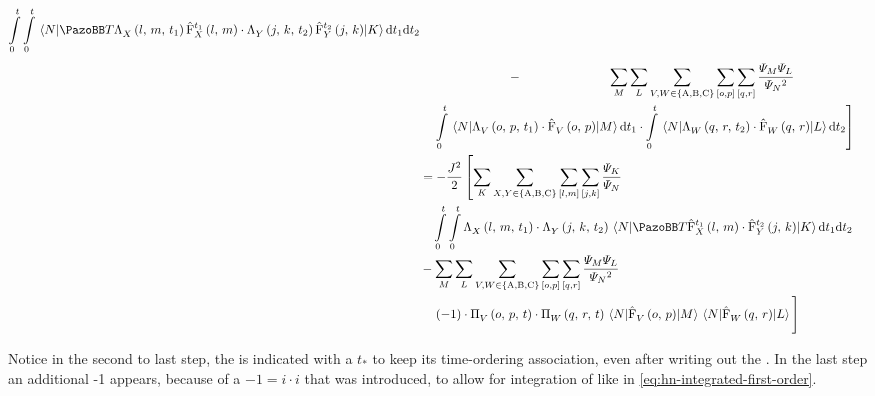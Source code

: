 \begin{equation}
\begin{split}
        \int\limits_0^t \int\limits_0^t        \bracketHelper{N}{\timeOrderingOperator
        \VhamiltonianAnalyticalPart{$X$}{l}{m}{t_1} \VhamiltonianOperatorPart[t_1]{$X$}{l}{m}
        \cdot 
        \VhamiltonianAnalyticalPart{$Y$}{j}{k}{t_2} \VhamiltonianOperatorPart[t_2]{$Y$}{j}{k}
        }{K}            \mathrm{d}t_1\mathrm{d}t_2 \\
        &\stackrel{\phantom{\ref{eq:interaction-picture-v-ham-full}}}{-} 
        \lsum[M]\lsum[L]\lsum[V,W \in \left\{\text{A}, \text{B}, \text{C}\right\}]
        \fullneighborsum{o}{p}\fullneighborsum{q}{r}
        \frac{\psiN[M]\psiN[L]}{\psiN{}^2}\\&\quad
        \left.
        \int\limits_0^t \bracketHelper{N}{\VhamiltonianAnalyticalPart{$V$}{o}{p}{t_1} \cdot \VhamiltonianOperatorPart{$V$}{o}{p}}{M}  \mathrm{d}t_1
        \cdot
        \int\limits_0^t \bracketHelper{N}{\VhamiltonianAnalyticalPart{$W$}{q}{r}{t_2} \cdot \VhamiltonianOperatorPart{$W$}{q}{r}}{L}  \mathrm{d}t_2 \right]\\
        &=
        - \frac{J^2}{2} \left[ 
        \lsum[K]\lsum[X,Y \in \left\{\text{A}, \text{B}, \text{C}\right\}] \fullneighborsum{l}{m}\fullneighborsum{j}{k}
        \frac{\psiN[K]}{\psiN} 
        \right.
        \\&\quad
        \int\limits_0^t \int\limits_0^t  
        \VhamiltonianAnalyticalPart{$X$}{l}{m}{t_1}
        \cdot 
        \VhamiltonianAnalyticalPart{$Y$}{j}{k}{t_2}
        \bracketHelper{N}{\timeOrderingOperator
            \VhamiltonianOperatorPart[t_1]{$X$}{l}{m}
        \cdot 
            \VhamiltonianOperatorPart[t_2]{$Y$}{j}{k}
        }{K}            \mathrm{d}t_1\mathrm{d}t_2 \\
        & - 
        \lsum[M]\lsum[L]\lsum[V,W \in \left\{\text{A}, \text{B}, \text{C}\right\}]
        \fullneighborsum{o}{p}\fullneighborsum{q}{r}
        \frac{\psiN[M]\psiN[L]}{\psiN{}^2}\\&\quad
        \left.
            (-1) \cdot \VhamiltonianAnalyticalPartIntegrated{$V$}{o}{p}{t} 
            \cdot
            \VhamiltonianAnalyticalPartIntegrated{$W$}{q}{r}{t}
            \bracketHelper{N}{\VhamiltonianOperatorPart{$V$}{o}{p}}{M}
            \bracketHelper{N}{\VhamiltonianOperatorPart{$W$}{q}{r}}{L}
            \vphantom{
                \lsum[M]
            }
        \right]
    \end{split}
\end{equation}

Notice in the second to last step, the \VhamiltonianOperatorPart[t_\ast]{$\ast$}{\ast}{\ast} is indicated with a $t_\ast$ to keep its time-ordering association, even after writing out the .
In the last step an additional -1 appears, because of a $-1 = i \cdot i$ that was introduced, to allow for integration of  like in \autoref{eq:hn-integrated-first-order}.

